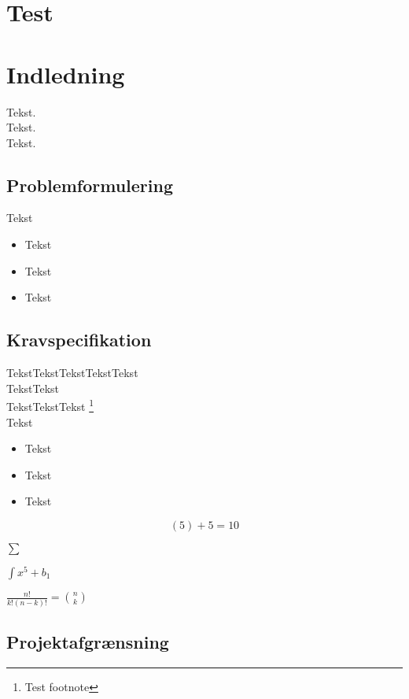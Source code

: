\section{Test}

\section{Indledning}

Tekst.\\

Tekst.\\

Tekst.\\




\subsection{Problemformulering}

Tekst
\begin{itemize}
	\item Tekst
	\item Tekst
	\item Tekst
\end{itemize}

\subsection{Kravspecifikation}

TekstTekstTekstTekstTekst\\
TekstTekst\\
TekstTekstTekst \footnote{Test footnote}\\
Tekst

\begin{itemize}
	\item Tekst
	\item Tekst
	\item Tekst

\end{itemize}

\[(5)+5=10\]


$\displaystyle \sum$


$\displaystyle \int x^5+b_1$


$\frac{n!}{k!(n-k)!} = \binom{n}{k}$

\subsection{Projektafgrænsning}

